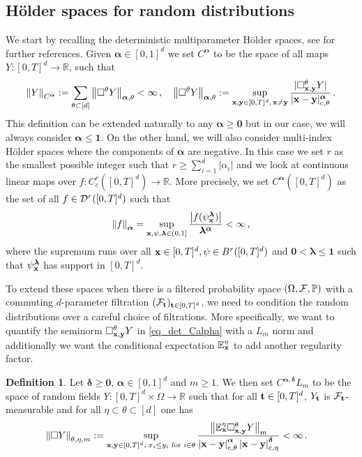 \documentclass[12pt]{article}
\numberwithin{equation}{section}
\theoremstyle{plain}
\theoremstyle{definition}
\newtheorem{definition}[theorem]{Definition}
\newcommand{\abs}[1]{\left\vert #1 \right\vert}
\newcommand{\norm}[1]{\left\Vert #1\right\Vert}
\newcommand{\R}{\ensuremath{{\mathbb R}}}
\def\bR{\mathbb{R}}\def\bS{\mathbb{S}}
\def\bE{\mathbb{E}}\def\bW{\mathbb{W}}
\def\bP{\mathbb{P}}\def\bU{\mathbb{U}}
\def\fy{\mathbf y}\def\fz{\mathbf z}
\def\falpha{{\boldsymbol\alpha}}
\def\fdelta{{\boldsymbol\delta}}
\def\flambda{{\boldsymbol\lambda}}
\def\foo{{\boldsymbol 0}}
\def\fone{{\boldsymbol 1}}
\begin{document}
\subsection{H\"older spaces for random distributions}\label{sec:hoelderSpacesRandom}
 We start by recalling the deterministic multiparameter H\"older spaces, see  \cite{tindel07,harang21} for further references. Given $\falpha\in [0,1]^d$ we set $C^\falpha$ to be the space of all maps $Y\colon [0,T]^d\to \mathbb{R}$, such that
\begin{equation}\label{eq_det_Calpha}
\norm{Y}_{C^\falpha} := \sum_{\theta\subset[d]} \norm{\square^\theta Y}_{\falpha,\theta} <\infty\,,\quad  \norm{\square^\theta Y}_{\falpha,\theta}:=\sup_{\fx, \fy\in [0,T]^d,\, \fx\neq \fy} \frac{|\square^\theta_{\fx,\fy} Y|}{|\fx- \fy|^{\falpha}_{\text{c}, \theta}}\,.
\end{equation}
This definition can be extended naturally to any $\falpha\ge\foo$  but in our case, we will always consider $\falpha\le \fone$. On the other hand, we will also consider multi-index H\"older spaces where the components of  $\falpha$ are negative. In this case we  set $r$ as the smallest possible integer  such that $ r\ge \sum_{i=1}^d \abs{\alpha_i}$ and we look at continuous linear maps over $f:C_c^r ([0,T]^d)\to\R$. More precisely, we set $C^{\falpha}([0,T]^d)$ as the set of all $f\in \mathcal{D}^r([0,T]^d)$ such that 
\begin{equation*}
    \norm{f}_{\falpha} = \sup_{\fx,\psi,\flambda\in(0,1]} \frac{\abs{f(\psi_{\fx}^{\flambda})}}{\flambda^{\falpha}}<\infty\,,
\end{equation*}
where the supremum runs over all $\mathbf x\in[0,T]^d, \psi\in B^r([0,T]^d)$ and $\foo<\flambda\le \fone$ such that $\psi_\fx^{\flambda}$ has support in $[0,T]^d$. 

To extend these spaces when there is a filtered probability space $(\Omega,\cF,\bP)$ with a commuting $d$-parameter filtration $(\mathcal{F}_\mathbf t)_{\mathbf t\in[0,T]^d}$, we need to condition the random distributions over a careful choice of filtrations. More specifically, we want to quantify the seminorm $\square^\theta_{\fx,\fy} Y$  in \eqref{eq_det_Calpha} with a  $L_m$ norm and additionally we want the conditional expectation $\bE^\eta_\fx$ to add another regularity factor.
\begin{definition}\label{def:C_alpha-stoc}
    Let $\fdelta \ge \foo$, $\falpha\in [0,1]^d$ and $m\ge 1$. We then set $C^{\falpha,\fdelta}L_m$ to be the space of random fields $Y:[0,T]^d\times\Omega\to\bR$ such that for all $\mathbf t\in[0,T]^d$, $Y_\mathbf t$ is $\mathcal F_\mathbf t$-measurable and
     for all $\eta\subset\theta\subset[d]$ one has
    \begin{align}\label{theta_eta_seminorm}
        \norm{\square Y}_{\theta,\eta,m} &:= \sup_{\fx,\fy\in[0,T]^d,\; x_i\le y_i \text{ for } i\in\theta}\frac{\norm{\bE^\eta_\fx\square^\theta_{\fx,\fy} Y}_m}{\abs{\fx-\fy}^{\falpha}_{\text{c},\theta}\abs{\fx-\fy}^{\fdelta}_{\text{c},\eta}}<\infty\,.
    \end{align}
\end{definition}
\end{document}
